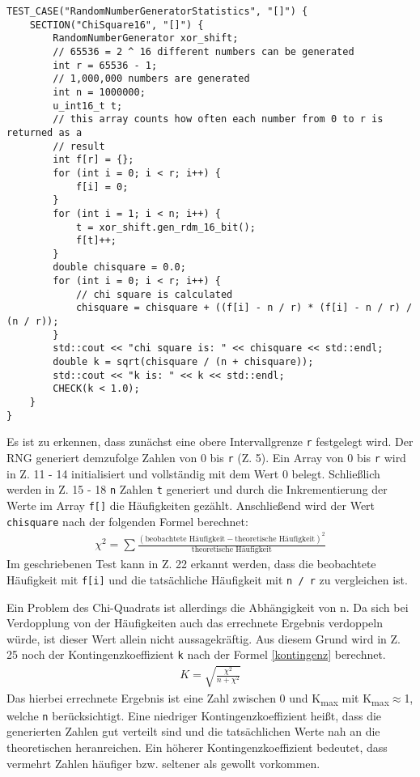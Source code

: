 \documentclass[../review_3.tex]{subfiles}
\begin{document}
\begin{lstlisting}[caption= {Chi-Quadrat-Test}, label = chisquaretest]
TEST_CASE("RandomNumberGeneratorStatistics", "[]") {
    SECTION("ChiSquare16", "[]") {
        RandomNumberGenerator xor_shift;
        // 65536 = 2 ^ 16 different numbers can be generated
        int r = 65536 - 1;
        // 1,000,000 numbers are generated
        int n = 1000000;
        u_int16_t t;
        // this array counts how often each number from 0 to r is returned as a
        // result
        int f[r] = {};
        for (int i = 0; i < r; i++) {
            f[i] = 0;
        }
        for (int i = 1; i < n; i++) {
            t = xor_shift.gen_rdm_16_bit();
            f[t]++;
        }
        double chisquare = 0.0;
        for (int i = 0; i < r; i++) {
            // chi square is calculated
            chisquare = chisquare + ((f[i] - n / r) * (f[i] - n / r) / (n / r));
        }
        std::cout << "chi square is: " << chisquare << std::endl;
        double k = sqrt(chisquare / (n + chisquare));
        std::cout << "k is: " << k << std::endl;
        CHECK(k < 1.0);
    }
}\end{lstlisting}

Es ist zu erkennen, dass zunächst eine obere Intervallgrenze  \texttt{r} festgelegt wird. Der RNG generiert demzufolge Zahlen von 0 bis \texttt{r} (Z. 5). Ein Array von 0 bis \texttt{r} wird in Z. 11 - 14 initialisiert und vollständig mit dem Wert 0 belegt. Schließlich werden in Z. 15 - 18 \texttt{n} Zahlen \texttt{t} generiert und durch die Inkrementierung der Werte im Array \texttt{f[]} die Häufigkeiten gezählt. Anschließend wird der Wert \texttt{chisquare} nach der folgenden Formel berechnet:
\begin{align} \label {chisquare}
    \chi^2 = \sum \frac{(\text{beobachtete Häufigkeit}-\text{theoretische Häufigkeit})^2}{\text{theoretische Häufigkeit}}   
\end{align}
Im geschriebenen Test kann in Z. 22 erkannt werden, dass die beobachtete Häufigkeit mit \texttt{f[i]} und die tatsächliche Häufigkeit mit \texttt{n / r} zu vergleichen ist.

Ein Problem des Chi-Quadrats ist allerdings die Abhängigkeit von n. Da sich bei Verdopplung von der Häufigkeiten auch das errechnete Ergebnis verdoppeln würde, ist dieser Wert allein nicht aussagekräftig. Aus diesem Grund wird in Z. 25 noch der Kontingenzkoeffizient \texttt{k} nach der Formel \ref{kontingenz} berechnet.
\begin{align} \label{kontingenz}
    K = \sqrt{\frac{\chi^2}{n+\chi^2}}    
\end{align}
Das hierbei errechnete Ergebnis ist eine Zahl zwischen 0 und K\textsubscript{max} mit K\textsubscript{max}$\approx$1, welche \texttt{n} berücksichtigt. Eine niedriger Kontingenzkoeffizient heißt, dass die generierten Zahlen gut verteilt sind und die tatsächlichen Werte nah an die theoretischen heranreichen. Ein höherer Kontingenzkoeffizient bedeutet, dass vermehrt Zahlen häufiger bzw. seltener als gewollt vorkommen.
\end{document}
